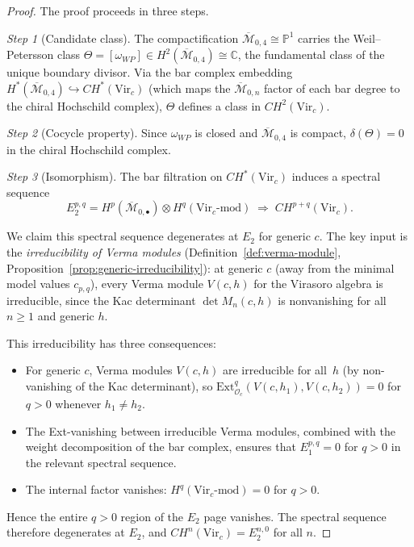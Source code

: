 \begin{proof}
The proof proceeds in three steps.

\emph{Step 1} (Candidate class).
The compactification $\overline{\mathcal{M}}_{0,4} \cong \mathbb{P}^1$ carries
the Weil--Petersson class
$\Theta = [\omega_{WP}] \in H^2(\overline{\mathcal{M}}_{0,4}) \cong \mathbb{C}$,
the fundamental class of the unique boundary divisor.  Via the bar complex
embedding $H^*(\overline{\mathcal{M}}_{0,4}) \hookrightarrow CH^*(\mathrm{Vir}_c)$
(which maps the $\overline{\mathcal{M}}_{0,n}$ factor of each bar degree to
the chiral Hochschild complex), $\Theta$ defines a class in $CH^2(\mathrm{Vir}_c)$.

\emph{Step 2} (Cocycle property).
Since $\omega_{WP}$ is closed and $\overline{\mathcal{M}}_{0,4}$ is compact,
$\delta(\Theta) = 0$ in the chiral Hochschild complex.

\emph{Step 3} (Isomorphism).
The bar filtration on $CH^*(\mathrm{Vir}_c)$ induces a spectral sequence
\[
E_2^{p,q} = H^p(\overline{\mathcal{M}}_{0,\bullet}) \otimes
H^q(\mathrm{Vir}_c\text{-mod})
\;\Longrightarrow\; CH^{p+q}(\mathrm{Vir}_c).
\]

We claim this spectral sequence degenerates at $E_2$ for generic $c$.
The key input is the \emph{irreducibility of Verma modules}
(Definition~\ref{def:verma-module},
Proposition~\ref{prop:generic-irreducibility}): at generic $c$
(away from the minimal model values $c_{p,q}$), every Verma module
$V(c,h)$ for the Virasoro algebra is irreducible, since the Kac
determinant $\det M_n(c,h)$ is nonvanishing for all $n \geq 1$ and
generic $h$.

This irreducibility has three consequences:
\begin{itemize}
\item For generic $c$, Verma modules $V(c,h)$ are irreducible for all~$h$
      (by non-vanishing of the Kac determinant), so
      $\mathrm{Ext}^q_{\mathcal{O}_c}(V(c,h_1), V(c,h_2)) = 0$ for $q > 0$
      whenever $h_1 \neq h_2$.
\item The Ext-vanishing between irreducible Verma modules, combined with the weight decomposition
      of the bar complex, ensures that
      $E_1^{p,q} = 0$ for $q > 0$ in the relevant spectral sequence.
\item The internal factor vanishes:
      $H^q(\mathrm{Vir}_c\text{-mod}) = 0$ for $q > 0$.
\end{itemize}

Hence the entire $q>0$ region of the $E_2$ page vanishes.
The spectral sequence therefore degenerates at $E_2$, and
$CH^n(\mathrm{Vir}_c) = E_2^{n,0}$ for all $n$.


\end{proof}
